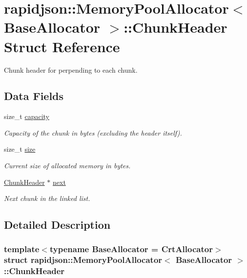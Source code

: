 \hypertarget{structrapidjson_1_1_memory_pool_allocator_1_1_chunk_header}{}\section{rapidjson\+::Memory\+Pool\+Allocator$<$ Base\+Allocator $>$\+::Chunk\+Header Struct Reference}
\label{structrapidjson_1_1_memory_pool_allocator_1_1_chunk_header}


Chunk header for perpending to each chunk.  


\subsection*{Data Fields}
\begin{DoxyCompactItemize}
\item 
size\+\_\+t \mbox{\hyperlink{structrapidjson_1_1_memory_pool_allocator_1_1_chunk_header_a2bce5ae3d208e501af06b36fe34411cf}{capacity}}
\begin{DoxyCompactList}\small\item\em Capacity of the chunk in bytes (excluding the header itself). \end{DoxyCompactList}\item 
size\+\_\+t \mbox{\hyperlink{structrapidjson_1_1_memory_pool_allocator_1_1_chunk_header_a585b07316f4ff3e9475608d8a0812bb3}{size}}
\begin{DoxyCompactList}\small\item\em Current size of allocated memory in bytes. \end{DoxyCompactList}\item 
\mbox{\hyperlink{structrapidjson_1_1_memory_pool_allocator_1_1_chunk_header}{Chunk\+Header}} $\ast$ \mbox{\hyperlink{structrapidjson_1_1_memory_pool_allocator_1_1_chunk_header_a448b562df88b314ee8e751b2146b8682}{next}}
\begin{DoxyCompactList}\small\item\em Next chunk in the linked list. \end{DoxyCompactList}\end{DoxyCompactItemize}


\subsection{Detailed Description}
\subsubsection*{template$<$typename Base\+Allocator = Crt\+Allocator$>$\newline
struct rapidjson\+::\+Memory\+Pool\+Allocator$<$ Base\+Allocator $>$\+::\+Chunk\+Header}

